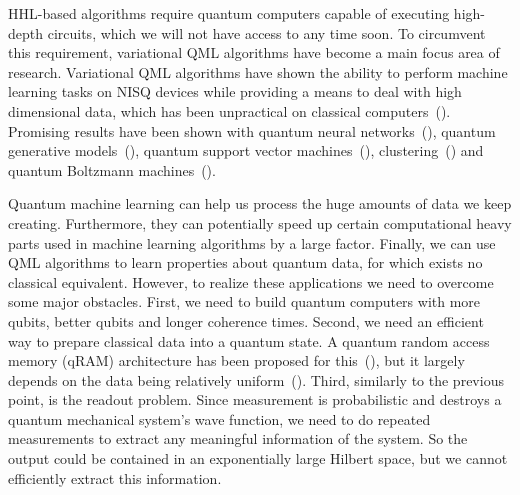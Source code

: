 \documentclass[a4paper,10pt]{article}
\begin{document}
HHL-based algorithms require quantum computers capable of executing high-depth circuits, which we will not have access to any time soon.
To circumvent this requirement, variational QML algorithms have become a main focus area of research.
Variational QML algorithms have shown the ability to perform machine learning tasks on NISQ devices while providing a means to deal with high dimensional data, which has been unpractical on classical computers~(\cite{mitarai2018quantum}).
Promising results have been shown with quantum neural networks~(\cite{qnn-near-term, schuld2018circuit, fanizza2019optimal, grant2018hierarchical}), quantum generative models~(\cite{romero2019variational, benedetti2019adversarial, benedetti2019generative}), quantum support vector machines~(\cite{havlivcek2019supervised, schuld2019quantum, ghobadi2019power}), clustering~(\cite{otterbach2017unsupervised}) and quantum Boltzmann machines~(\cite{verdon2017quantum, anschuetz2019realizing}).

Quantum machine learning can help us process the huge amounts of data we keep creating.
Furthermore, they can potentially speed up certain computational heavy parts used in machine learning algorithms by a large factor.
Finally, we can use QML algorithms to learn properties about quantum data, for which exists no classical equivalent.
However, to realize these applications we need to overcome some major obstacles.
First, we need to build quantum computers with more qubits, better qubits and longer coherence times.
Second, we need an efficient way to prepare classical data into a quantum state.
A quantum random access memory (qRAM) architecture has been proposed for this~(\cite{qram}), but it largely depends on the data being relatively uniform~(\cite{aaronson2015read}).
Third, similarly to the previous point, is the readout problem.
Since measurement is probabilistic and destroys a quantum mechanical system's wave function, we need to do repeated measurements to extract any meaningful information of the system.
So the output could be contained in an exponentially large Hilbert space, but we cannot efficiently extract this information.
\end{document}
